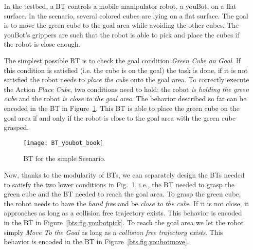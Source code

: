 In the testbed, a BT controls a mobile manipulator robot, a youBot, on a flat surface. In the scenario, several colored cubes are lying on a flat surface. The goal is to move the green cube to the goal area while avoiding the other cubes. The youBot's grippers are such that the robot is able to pick and place the cubes if the robot is close enough.

The simplest possible BT is to check the goal condition \emph{Green Cube on Goal}. If this condition is satisfied (i.e. the cube is on the goal) the task is done, if it is not satisfied the robot needs to \emph{place the cube} onto the goal area. To correctly execute the Action \emph{Place Cube}, two conditions need to hold: the robot \emph{is holding the green cube} and the robot \emph{is close to the goal area}. The behavior described so far can be encoded in the BT in Figure~\ref{bts.fig.youbotsimple}. This BT is able to 
place the green cube on the goal area if and only if the robot is close to the goal area with the green cube grasped.

\begin{figure}[h]
\centering
\texttt{[image: BT\_youbot\_book]}
\caption{BT for the simple Scenario.}
\label{bts.fig.youbotsimple}
\end{figure}



Now, thanks to the modularity of BTs, we can separately design the BTs needed to satisfy the two lower conditions in Fig.~\ref{bts.fig.youbotsimple}, i.e., the BT needed to grasp the green cube and the BT needed to reach the goal area. To grasp the green cube, the robot needs to have the \emph{hand free} and be \emph{close to the cube}. If it is not close, it approaches as long as a collision free trajectory exists. This behavior is encoded in the BT in Figure~\ref{bts.fig.youbotpick}. To reach the goal area we let the robot simply \emph{Move To the Goal}  as long as a \emph{collision free trajectory exists}. This behavior is encoded in the BT in Figure~\ref{bts.fig.youbotmove}.

